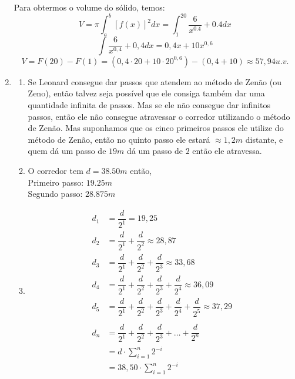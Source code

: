 \documentclass[english,ngerman,parskip=half]{scrartcl}
\begin{document}
\begin{enumerate}
        
        Para obtermos o volume do sólido, temos:
        $$ V = \pi \int_a^b[f(x)]^2 dx = \int_1^{20} \dfrac{6}{x^{0.4}} + 0.4 dx$$
        $$ \int \dfrac{6}{x^{0,4}} + 0,4 dx = 0,4x + 10 x^{0,6} $$
        $$ V = F(20) - F(1) = (0,4 \cdot 20 + 10 \cdot 20^{0,6}) - (0,4 + 10) \approx 57,94 u.v.$$
        

    \item 
        \begin{enumerate}
            \item Se Leonard consegue  dar passos que atendem ao método de Zenão (ou Zeno), então talvez seja
                possível que 
                ele consiga também dar uma quantidade infinita de passos. Mas se ele não consegue 
                dar infinitos passos, então ele não consegue atravessar o corredor utilizando o método de Zenão.
                Mas suponhamos que os cinco primeiros passos ele utilize do método de Zenão, então no quinto passo
                ele estará $\approx 1,2m$ distante, e quem dá um passo de $19m$ dá um passo de $2$ então ele atravessa.
            \item
                O corredor tem $d = 38.50m$ então, \\
                Primeiro passo: $19.25m$ \\
                Segundo passo: $28.875m$ 
            \item 
                \begin{align*}
                    d_1 &= \dfrac{d}{2^1} = 19,25\\
                    d_2 &= \dfrac{d}{2^1} + \dfrac{d}{2^2} \approx 28,87 \\
                    d_3 &= \dfrac{d}{2^1} + \dfrac{d}{2^2} + \dfrac{d}{2^3} \approx 33,68 \\
                    d_4 &= \dfrac{d}{2^1} + \dfrac{d}{2^2} + \dfrac{d}{2^3} + \dfrac{d}{2^4} \approx 36,09 \\
                    d_5 &= \dfrac{d}{2^1} + \dfrac{d}{2^2} + \dfrac{d}{2^3} + \dfrac{d}{2^4} + \dfrac{d}{2^5} \approx 37,29 \\
                    \\
                    d_n &= \dfrac{d}{2^1} + \dfrac{d}{2^2} + \dfrac{d}{2^3} + \hdots + \dfrac{d}{2^n} \\
                        &= d \cdot \sum_{i=1}^n 2^{-i} \\
                        &= 38,50 \cdot \sum_{i=1}^n 2^{-i} 

\end{align*}
\end{enumerate}
\end{enumerate}
\end{document}
